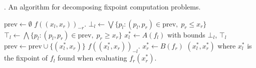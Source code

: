 \begin{algorithm}[h]
  \caption{\citep{fasterTarski}. An algorithm for decomposing fixpoint computation problems.}\label{fixDecompAlg}
  \begin{algorithmic}[1]
    \State $\mathrm{prev} \gets \emptyset$
        \Return $f((x_l, x_r))_{-r}$.
      \EndProcedure
      \State $\bot_l \gets \bigvee\{p_l : (p_l, p_r) \in \mathrm{prev}, \; p_r \leq x_r \}$
      \State $\top_l \gets \bigwedge\{p_l : (p_l, p_r) \in \mathrm{prev}, \; p_r \geq x_r \}$
      \State $x_l^* \gets A(f_l)$ with bounds $\bot_l$, $\top_l$
      \State $\mathrm{prev} \gets \mathrm{prev} \cup \{(x_l^*, x_r)\}$
      \State \Return $f((x_l^*, x_r))_{-l}$.
    \EndProcedure
    \State $x_r^* \gets B(f_r)$
    \State \Return $(x_l^*, x_r^*)$ where $x_l^*$ is the fixpoint of $f_l$ 
    found when evaluating $f_r(x_r^*)$.
  \EndProcedure
  \end{algorithmic}
\end{algorithm}

